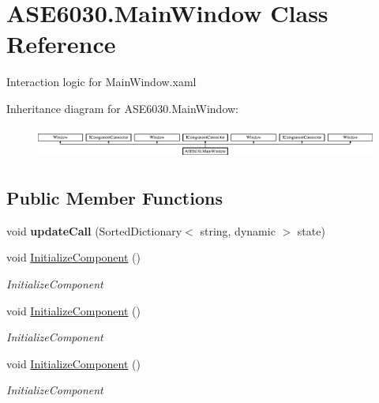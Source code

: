 \hypertarget{class_a_s_e6030_1_1_main_window}{}\section{A\+S\+E6030.\+Main\+Window Class Reference}
\label{class_a_s_e6030_1_1_main_window}


Interaction logic for Main\+Window.\+xaml  


Inheritance diagram for A\+S\+E6030.\+Main\+Window\+:\begin{figure}[H]
\begin{center}
\leavevmode
\includegraphics[height=1.073825cm]{class_a_s_e6030_1_1_main_window}
\end{center}
\end{figure}
\subsection*{Public Member Functions}
\begin{DoxyCompactItemize}
\item 
\mbox{\label{class_a_s_e6030_1_1_main_window_adeaea371e5e8ae0d36da0488e3f573a9}} 
void {\bfseries update\+Call} (Sorted\+Dictionary$<$ string, dynamic $>$ state)
\item 
void \hyperlink{class_a_s_e6030_1_1_main_window_ae87e50858240332fce20264ac23638e8}{Initialize\+Component} ()
\begin{DoxyCompactList}\small\item\em Initialize\+Component \end{DoxyCompactList}\item 
void \hyperlink{class_a_s_e6030_1_1_main_window_ae87e50858240332fce20264ac23638e8}{Initialize\+Component} ()
\begin{DoxyCompactList}\small\item\em Initialize\+Component \end{DoxyCompactList}\item 
void \hyperlink{class_a_s_e6030_1_1_main_window_ae87e50858240332fce20264ac23638e8}{Initialize\+Component} ()
\begin{DoxyCompactList}\small\item\em Initialize\+Component \end{DoxyCompactList}\end{DoxyCompactItemize}


